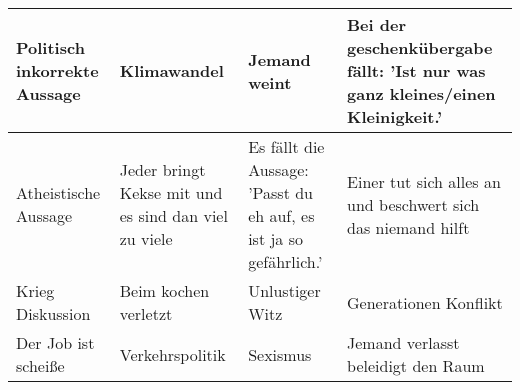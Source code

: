 \begin{table}
\begin{tabularx}{\linewidth}{|X|X|X|X|}
\hline
Politisch inkorrekte Aussage & Klimawandel & Jemand weint & Bei der geschenkübergabe fällt: 'Ist nur was ganz kleines/einen Kleinigkeit.' \\ \hline
Atheistische Aussage & Jeder bringt Kekse mit und es sind dan viel zu viele & Es fällt die Aussage: 'Passt du eh auf, es ist ja so gefährlich.' & Einer tut sich alles an und beschwert sich das niemand hilft \\ \hline
Krieg Diskussion & Beim kochen verletzt & Unlustiger Witz & Generationen Konflikt \\ \hline
Der Job ist scheiße & Verkehrspolitik & Sexismus & Jemand verlasst beleidigt den Raum \\ \hline
\end{tabularx}
\end{table}

